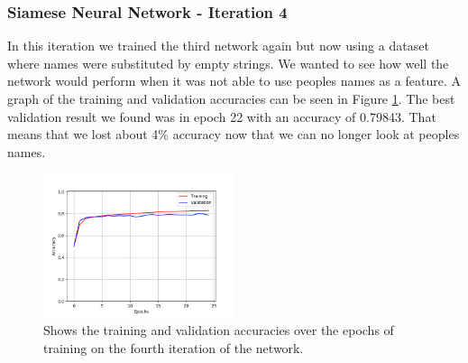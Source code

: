 \subsubsection{Siamese Neural Network - Iteration 4}

In this iteration we trained the third network again but now using a dataset
where names were substituted by empty strings. We wanted to see how well the
network would perform when it was not able to use peoples names as a feature.
A graph of the training and validation accuracies can be seen in Figure
\ref{fig:network_4_accuracies}. The best validation result we found was in epoch
22 with an accuracy of 0.79843. That means that we lost about 4\% accuracy now
that we can no longer look at peoples names.

\begin{figure}
    \centering
    \includegraphics[width=0.5\textwidth]{./pictures/experiments/network_4_accuracies.png}
    \caption{Shows the training and validation accuracies over the epochs of
        training on the fourth iteration of the network.}
    \label{fig:network_4_accuracies}
\end{figure}

